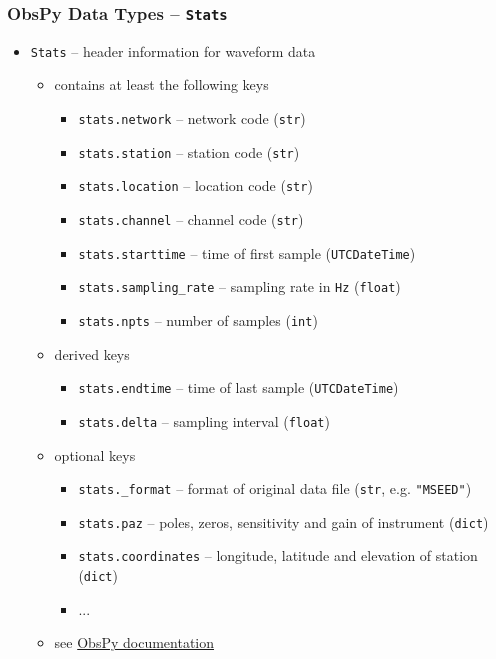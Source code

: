 \documentclass[t,10pt,compress=false,usepdftitle=false]{beamer}
\begin{document}
\begin{frame}[fragile]
    \frametitle{ObsPy Data Types -- \tt{Stats}}
    \begin{itemize}
    \item \verb#Stats# -- header information for waveform data
        \begin{itemize}
        \item contains at least the following keys
            \begin{itemize}
            \item \verb#stats.network# -- network code (\verb#str#)
            \item \verb#stats.station# -- station code (\verb#str#)
            \item \verb#stats.location# -- location code (\verb#str#)
            \item \verb#stats.channel# -- channel code (\verb#str#)
            \item \verb#stats.starttime# -- time of first sample (\verb#UTCDateTime#)
            \item \verb#stats.sampling_rate# -- sampling rate in \verb#Hz# (\verb#float#)
            \item \verb#stats.npts# -- number of samples (\verb#int#)
            \end{itemize}
        \item derived keys
            \begin{itemize}
            \item \verb#stats.endtime# -- time of last sample (\verb#UTCDateTime#)
            \item \verb#stats.delta# -- sampling interval (\verb#float#)
            \end{itemize}
        \item optional keys
            \begin{itemize}
            \item \verb#stats._format# -- format of original data file (\verb#str#, e.g. \verb#"MSEED"#)
            \item \verb#stats.paz# -- poles, zeros, sensitivity and gain of instrument (\verb#dict#)
            \item \verb#stats.coordinates# -- longitude, latitude and elevation of station (\verb#dict#)
            \item ...
            \end{itemize}
        \item see \href{file:///home/messuser/obspy/docs/packages/auto/obspy.core.trace.Stats.html}{ObsPy documentation}
        \end{itemize}
    \end{itemize}
\end{frame}
\end{document}
